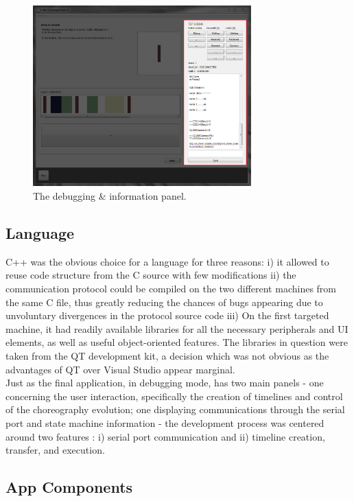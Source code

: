 \begin{figure}[ht]
   \centering
   \includegraphics[width=0.75\textwidth]{img/DebugPanel.png}
   \caption{The debugging \& information panel.}
   \label{img:DebugPanel}
\end{figure}

\subsection{Language}

C++ was the obvious choice for a language for three reasons: i) it allowed to reuse code structure from the C source with few modifications ii) the communication protocol could be compiled on the two different machines from the same C file, thus greatly reducing the chances of bugs appearing due to unvoluntary divergences in the protocol source code iii) On the first targeted machine, it had readily available libraries for all the necessary peripherals and UI elements, as well as useful object-oriented features. 
The libraries in question were taken from the QT development kit, a decision which was not obvious as the advantages of QT over Visual Studio appear marginal. \\

Just as the final application, in debugging mode, has two main panels - one concerning the user interaction, specifically the creation of timelines and control of the choreography evolution; one displaying communications through the serial port and state machine information - the development process was centered around two features : i) serial port communication and ii) timeline creation, transfer, and execution. 

\subsection{App Components}

